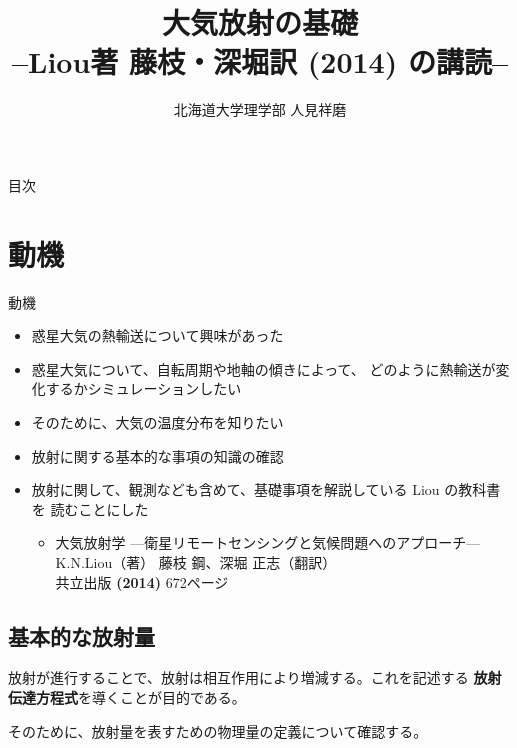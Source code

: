 \documentclass[unicode,colorlinks]{beamer}
\title{大気放射の基礎\\--Liou著 藤枝・深堀訳 (2014) の講読--}
\author{北海道大学理学部 人見祥磨}
\date{\warekitoday}
\begin{document}
\maketitle

\begin{frame}{目次}
	\tableofcontents
\end{frame}

\section{動機}

\begin{frame}{動機}
	\begin{itemize}
		\item 惑星大気の熱輸送について興味があった
		\item 惑星大気について、自転周期や地軸の傾きによって、
			どのように熱輸送が変化するかシミュレーションしたい
		\item そのために、大気の温度分布を知りたい
		\item 放射に関する基本的な事項の知識の確認
		\item 放射に関して、観測なども含めて、基礎事項を解説している Liou の教科書を
			読むことにした
			\begin{itemize}
				\item 大気放射学 {\scriptsize---衛星リモートセンシングと気候問題へのアプローチ---}\\
					K.N.Liou（著） 藤枝 鋼、深堀 正志（翻訳）\\
					共立出版 \textbf{(2014)} 672ページ
			\end{itemize}
	\end{itemize}
\end{frame}

\begin{frame}
	\section{基本的な放射量}

	放射が進行することで、放射は相互作用により増減する。これを記述する
	\textbf{放射伝達方程式}を導くことが目的である。

	そのために、放射量を表すための物理量の定義について確認する。
\end{frame}
\end{document}
